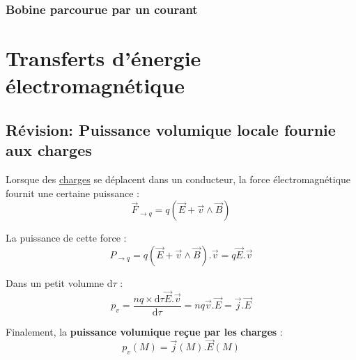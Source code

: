 
\subsubsection{Bobine parcourue par un courant} %
\label{sec:Bobine parcourue par un courant}


\newpage
\section{Transferts d'énergie électromagnétique} %
\label{sec:Transferts d'énergie électromagnétique}

\subsection{Révision: Puissance volumique locale fournie aux charges} %
\label{sub:Puissance volumique locale fournie aux charges}

Lorsque des \underline{charges} se déplacent dans un conducteur, la force électromagnétique fournit une certaine puissance : 
\begin{equation}
  \overrightarrow{F} _{\to q} = q ( \overrightarrow{E} + \overrightarrow{v} \wedge \overrightarrow{B})
\end{equation}

La puissance de cette force : 
\begin{equation}
  P _{\to q} = q (\overrightarrow{E} + \overrightarrow{v} \wedge \overrightarrow{B}). \overrightarrow{v} = q \overrightarrow{E}. \overrightarrow{v}
\end{equation}

Dans un petit volumne $\mathrm{d} \tau$ : 
\begin{equation}
  p_v = \frac{nq \times \mathrm{d}\tau \overrightarrow{E}. \overrightarrow{v}}{\mathrm{d}\tau}  = nq \overrightarrow{v}. \overrightarrow{E} = \overrightarrow{j}. \overrightarrow{E}
\end{equation}

Finalement, la \textbf{puissance volumique reçue par les charges} : 
\begin{equation}
  p_v (M) = \overrightarrow{j}(M). \overrightarrow{E}(M)
\end{equation}


